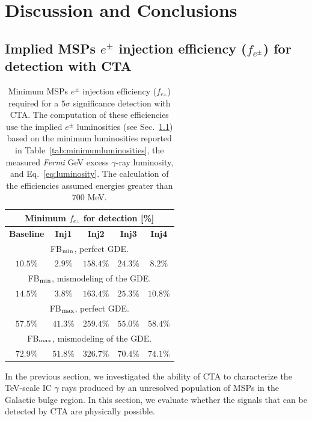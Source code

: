 \documentclass[doublespace,nopageskip]{VTthesis} %
\begin{document}
\section{Discussion and Conclusions}
\label{sec:discussions}

\subsection{Implied MSPs $e^\pm$ injection efficiency ($f_{e^\pm}$) for detection with CTA}
\label{sec:efficiency}
\begin{table}
  \begin{center}
    \begin{tabular}{c|c|c|c|c}
    \hline\hline  
     \multicolumn{5}{c}{ Minimum $f_{e^\pm}$ for detection [\%]}   \tabularnewline \hline
     \textbf{Baseline} & \textbf{Inj1} & \textbf{Inj2} & \textbf{Inj3} & \textbf{Inj4}\tabularnewline \hline
     \multicolumn{5}{c}{ 
     FB$_{\rm min}$, perfect GDE.}   \tabularnewline \hline
     $10.5\%$ & $2.9\%$ & $158.4\%$ & $24.3\%$ & $8.2\%$\tabularnewline \hline
     \multicolumn{5}{c}{ 
     FB$_{\rm min}$, mismodeling of the GDE.}\tabularnewline \hline
     $14.5\%$ & $3.8\%$ & $163.4\%$ & $25.3\%$ & $10.8\%$\tabularnewline \hline
     \multicolumn{5}{c}{ FB$_{\rm max}$, perfect GDE.}\tabularnewline \hline
     $57.5\%$ & $41.3\%$ & $259.4\%$ & $55.0\%$ & $58.4\%$\tabularnewline \hline
     \multicolumn{5}{c}{FB$_{\rm max}$, mismodeling of the GDE.}\tabularnewline \hline
     $72.9\%$ & $51.8\%$ & $326.7\%$ & $70.4\%$ & $74.1\%$\tabularnewline 
     \hline\hline
    \end{tabular}
\caption{Minimum MSPs $e^{\pm}$ injection efficiency ($f_{e^\pm}$) required for a $5\sigma$ significance detection with CTA. The computation of these efficiencies use the implied $e^\pm$ luminosities (see Sec.~\ref{sec:efficiency}) based on the minimum luminosities reported in Table~\ref{tab:minimumluminosities}, the measured \textit{Fermi} GeV excess $\gamma$-ray luminosity, and Eq.~\ref{eq:luminosity}. The calculation of the efficiencies assumed energies greater than 700 MeV.}\label{tab:minimumfe}
  \end{center}
\end{table}


In the previous section, we  investigated the ability of CTA to characterize the TeV-scale IC $\gamma$ rays produced by an unresolved population of MSPs in the Galactic bulge region. In this section, we evaluate whether the signals that can be detected by CTA are physically possible.
\end{document}
